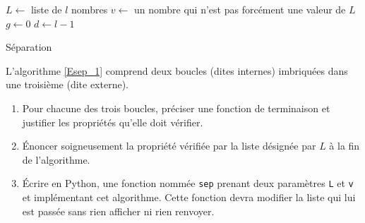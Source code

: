 \begin{algorithm}
  $L \leftarrow $ liste de $l$ nombres\;
  $v \leftarrow $ un nombre qui n'est pas forcément une valeur de $L$\;
  $g \leftarrow 0$\;
  $d \leftarrow l-1$\;
  \caption{Séparation}
  \label{Esep_1}
\end{algorithm}
L'algorithme \ref{Esep_1} comprend deux boucles (dites internes) imbriquées dans une troisième (dite externe).
\begin{enumerate}
  \item Pour chacune des trois boucles, préciser une fonction de terminaison et justifier les propriétés qu'elle doit vérifier.
  \item \'Enoncer soigneusement la propriété vérifiée par la liste désignée par $L$ à la fin de l'algorithme. 
  \item \'Ecrire en Python, une fonction nommée \texttt{sep} prenant deux paramètres \texttt{L} et \texttt{v} et implémentant cet algorithme. Cette fonction devra modifier la liste qui lui est passée sans rien afficher ni rien renvoyer.
\end{enumerate}
